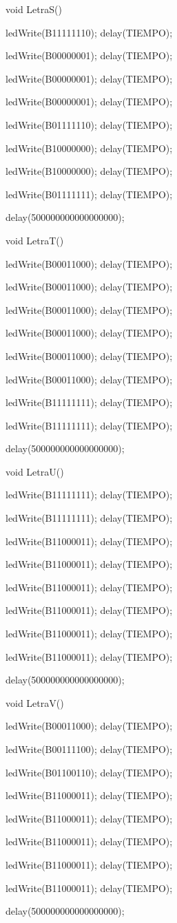 \documentclass{article}
\begin{document}
void LetraS(){

   ledWrite(B11111110); delay(TIEMPO);

   ledWrite(B00000001); delay(TIEMPO);

   ledWrite(B00000001); delay(TIEMPO);

   ledWrite(B00000001); delay(TIEMPO);

   ledWrite(B01111110); delay(TIEMPO);

   ledWrite(B10000000); delay(TIEMPO);

   ledWrite(B10000000); delay(TIEMPO);

   ledWrite(B01111111); delay(TIEMPO);

  delay(500000000000000000);}

void LetraT(){

   ledWrite(B00011000); delay(TIEMPO);

   ledWrite(B00011000); delay(TIEMPO);

   ledWrite(B00011000); delay(TIEMPO);

   ledWrite(B00011000); delay(TIEMPO);

   ledWrite(B00011000); delay(TIEMPO);

   ledWrite(B00011000); delay(TIEMPO);

   ledWrite(B11111111); delay(TIEMPO);

   ledWrite(B11111111); delay(TIEMPO);

  delay(500000000000000000);}

void LetraU(){

   ledWrite(B11111111); delay(TIEMPO);

   ledWrite(B11111111); delay(TIEMPO);

   ledWrite(B11000011); delay(TIEMPO);

   ledWrite(B11000011); delay(TIEMPO);

   ledWrite(B11000011); delay(TIEMPO);

   ledWrite(B11000011); delay(TIEMPO);

   ledWrite(B11000011); delay(TIEMPO);

   ledWrite(B11000011); delay(TIEMPO);

  delay(500000000000000000);}

void LetraV(){

   ledWrite(B00011000); delay(TIEMPO);

   ledWrite(B00111100); delay(TIEMPO);

   ledWrite(B01100110); delay(TIEMPO);

   ledWrite(B11000011); delay(TIEMPO);

   ledWrite(B11000011); delay(TIEMPO);

   ledWrite(B11000011); delay(TIEMPO);

   ledWrite(B11000011); delay(TIEMPO);

   ledWrite(B11000011); delay(TIEMPO);

  delay(500000000000000000);}
\end{document}
